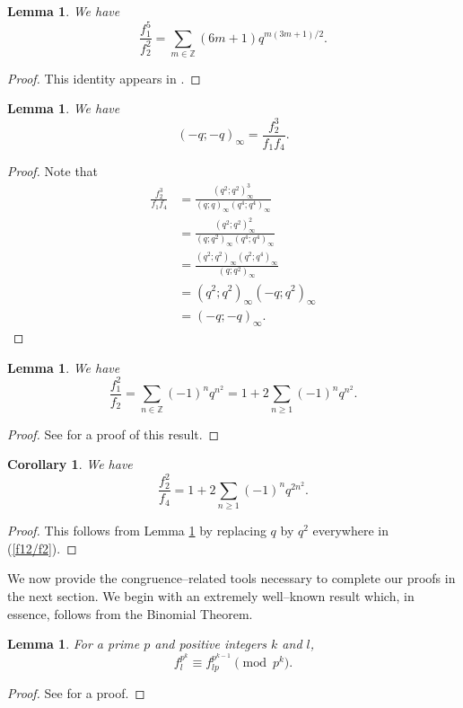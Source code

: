 \documentclass{amsart}
\newtheorem{lemma}[theorem]{Lemma}
\newtheorem{corollary}[theorem]{Corollary}
\theoremstyle{definition}
\begin{document}
\begin{lemma}  We have
  \begin{equation}\label{f15/f22}
        \frac{f_1^5}{f_2^2}=\sum_{m\in\mathbb{Z}}(6m+1)q^{m(3m+1)/2}.
    \end{equation}  
\end{lemma}
\begin{proof}
    This identity appears in \cite[Equation (10.7.3)]{Hirschhorn}.
\end{proof}
\begin{lemma}  We have
\begin{equation}\label{f1-q}
    (-q;-q)_\infty=\frac{f_2^3}{f_1 f_4}.
\end{equation}
\end{lemma}
\begin{proof} Note that 
\begin{align*}
\frac{f_2^3}{f_1f_4}
&=\frac{(q^2;q^2)_\infty^3}{(q;q)_\infty(q^4;q^4)_\infty} \\
&=\frac{(q^2;q^2)_\infty^2}{(q;q^2)_\infty(q^4;q^4)_\infty} \\
&=\frac{(q^2;q^2)_\infty(q^2;q^4)_\infty}{(q;q^2)_\infty}\\
&=(q^2;q^2)_\infty(-q;q^2)_\infty\\
&= (-q;-q)_\infty.
\end{align*}
\end{proof}
\begin{lemma}\label{lemma:f12overf21}  We have
\begin{equation}\label{f12/f2}
\frac{f_1^2}{f_2}=\sum_{n\in\mathbb{Z}}(-1)^nq^{n^2}=1+2\sum\limits_{n\ge 1}(-1)^nq^{n^2}.\end{equation}
\end{lemma}
\begin{proof}
    See \cite[(1.5.8)]{Hirschhorn} for a proof of this result.
\end{proof}

\begin{corollary}
      We have
\begin{equation}\label{f22/f4}
    \frac{f_2^2}{f_4}=1+2\sum\limits_{n\ge 1}(-1)^nq^{2n^2}.
\end{equation}
\end{corollary}
\begin{proof}

This follows from Lemma \ref{lemma:f12overf21} by replacing $q$ by $q^2$ everywhere in (\ref{f12/f2}).
\end{proof}
We now provide the congruence--related tools necessary to complete our proofs in the next section.  We begin with an extremely well--known result which, in essence, follows from the Binomial Theorem. 
\begin{lemma}\label{fdream}
    For a prime $p$ and positive integers $k$ and $l$,
    \begin{equation}\label{modp^k}
        f_l^{p^k}\equiv f_{lp}^{p^{k-1}}\pmod{p^k}.
    \end{equation}
\end{lemma}
\begin{proof}
    See \cite[Lemma 3]{daSilva-Sellers_20} for a proof.
\end{proof}
\end{document}
